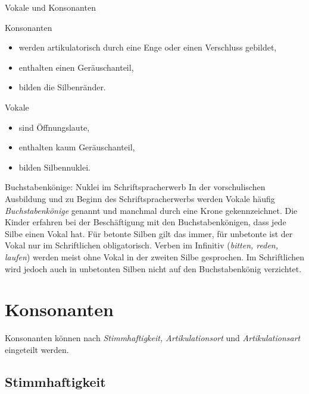 \begin{Definition}{Vokale und Konsonanten}

\noindent
{}Konsonanten
\begin{itemize}
    \item werden artikulatorisch durch eine Enge oder einen Verschluss gebildet,
    \item enthalten einen Geräuschanteil,
    \item bilden die Silbenränder.
\end{itemize}
\newpage
{}Vokale
\begin{itemize}
    \item sind Öffnungslaute,
    \item enthalten kaum Geräuschanteil,
    \item bilden Silbennuklei.
\end{itemize}


\end{Definition}



\begin{Exkurs}{Buchstabenkönige: Nuklei im Schriftspracherwerb}
In der vorschulischen Ausbildung und zu Beginn des Schriftspracherwerbs werden Vokale häufig \textit{Buchstabenkönige} genannt und manchmal durch eine Krone gekennzeichnet. Die Kinder erfahren bei der Beschäftigung mit den Buchstabenkönigen, dass jede Silbe einen Vokal hat. Für betonte Silben gilt das immer, für unbetonte ist der Vokal nur im Schriftlichen obligatorisch. Verben im Infinitiv (\textit{bitten, reden, laufen}) werden meist ohne Vokal in der zweiten Silbe gesprochen. Im Schriftlichen wird jedoch auch in unbetonten Silben nicht auf den Buchstabenkönig verzichtet.
\end{Exkurs}



\section{Konsonanten}\label{sec:Konsonanten}

Konsonanten können nach \textit{Stimmhaftigkeit, Artikulationsort} und \textit{Artikulationsart} eingeteilt werden. 

\subsection{Stimmhaftigkeit}
\label{sec:Stimmhaftigkeit}

